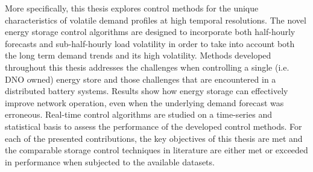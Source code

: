More specifically, this thesis explores control methods for the unique characteristics of volatile demand profiles at high temporal resolutions.
The novel energy storage control algorithms are designed to incorporate both half-hourly forecasts and sub-half-hourly load volatility in order to take into account both the long term demand trends and its high volatility.
Methods developed throughout this thesis addresses the challenges when controlling a single (i.e. DNO owned) energy store and those challenges that are encountered in a distributed battery systems.
Results show how energy storage can effectively improve network operation, even when the underlying demand forecast was erroneous.
Real-time control algorithms are studied on a time-series and statistical basis to assess the performance of the developed control methods.
For each of the presented contributions, the key objectives of this thesis are met and the comparable storage control techniques in literature are either met or exceeded in performance when subjected to the available datasets.

 